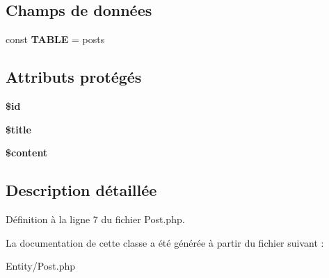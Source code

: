 \subsection*{Champs de données}
\begin{DoxyCompactItemize}
\item 
const {\bfseries T\+A\+B\+LE} = \textquotesingle{}posts\textquotesingle{}\hypertarget{class_entity_1_1_post_adf62e2b172196282218b1ece3d200fa1}{}\label{class_entity_1_1_post_adf62e2b172196282218b1ece3d200fa1}

\end{DoxyCompactItemize}
\subsection*{Attributs protégés}
\begin{DoxyCompactItemize}
\item 
{\bfseries \$id}\hypertarget{class_entity_1_1_post_ae97941710d863131c700f069b109991e}{}\label{class_entity_1_1_post_ae97941710d863131c700f069b109991e}

\item 
{\bfseries \$title}\hypertarget{class_entity_1_1_post_ada57e7bb7c152edad18fe2f166188691}{}\label{class_entity_1_1_post_ada57e7bb7c152edad18fe2f166188691}

\item 
{\bfseries \$content}\hypertarget{class_entity_1_1_post_a57b284fe00866494b33afa80ba729bed}{}\label{class_entity_1_1_post_a57b284fe00866494b33afa80ba729bed}

\end{DoxyCompactItemize}


\subsection{Description détaillée}


Définition à la ligne 7 du fichier Post.\+php.



La documentation de cette classe a été générée à partir du fichier suivant \+:\begin{DoxyCompactItemize}
\item 
Entity/Post.\+php\end{DoxyCompactItemize}
